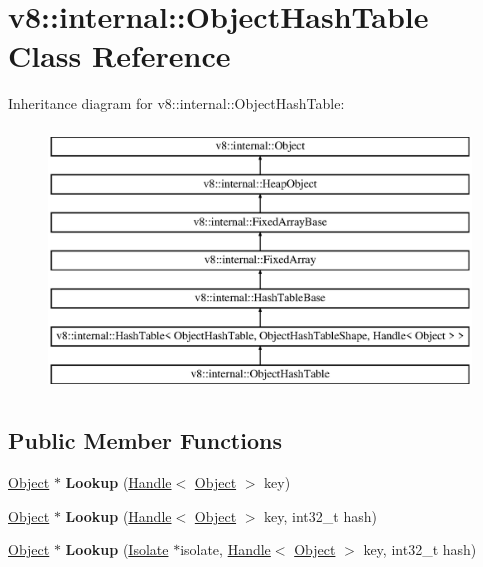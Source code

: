 \hypertarget{classv8_1_1internal_1_1_object_hash_table}{}\section{v8\+:\+:internal\+:\+:Object\+Hash\+Table Class Reference}
\label{classv8_1_1internal_1_1_object_hash_table}
Inheritance diagram for v8\+:\+:internal\+:\+:Object\+Hash\+Table\+:\begin{figure}[H]
\begin{center}
\leavevmode
\includegraphics[height=7.000000cm]{classv8_1_1internal_1_1_object_hash_table}
\end{center}
\end{figure}
\subsection*{Public Member Functions}
\begin{DoxyCompactItemize}
\item 
\hyperlink{classv8_1_1internal_1_1_object}{Object} $\ast$ {\bfseries Lookup} (\hyperlink{classv8_1_1internal_1_1_handle}{Handle}$<$ \hyperlink{classv8_1_1internal_1_1_object}{Object} $>$ key)\hypertarget{classv8_1_1internal_1_1_object_hash_table_aabab652b308038cba6f9dd2d99b6b159}{}\label{classv8_1_1internal_1_1_object_hash_table_aabab652b308038cba6f9dd2d99b6b159}

\item 
\hyperlink{classv8_1_1internal_1_1_object}{Object} $\ast$ {\bfseries Lookup} (\hyperlink{classv8_1_1internal_1_1_handle}{Handle}$<$ \hyperlink{classv8_1_1internal_1_1_object}{Object} $>$ key, int32\+\_\+t hash)\hypertarget{classv8_1_1internal_1_1_object_hash_table_a00dbeb2eb8efbd982c5eb2bc145abdf0}{}\label{classv8_1_1internal_1_1_object_hash_table_a00dbeb2eb8efbd982c5eb2bc145abdf0}

\item 
\hyperlink{classv8_1_1internal_1_1_object}{Object} $\ast$ {\bfseries Lookup} (\hyperlink{classv8_1_1internal_1_1_isolate}{Isolate} $\ast$isolate, \hyperlink{classv8_1_1internal_1_1_handle}{Handle}$<$ \hyperlink{classv8_1_1internal_1_1_object}{Object} $>$ key, int32\+\_\+t hash)\hypertarget{classv8_1_1internal_1_1_object_hash_table_a0698c7cb08c4d8cdf07745148a775234}{}\label{classv8_1_1internal_1_1_object_hash_table_a0698c7cb08c4d8cdf07745148a775234}

\end{DoxyCompactItemize}
